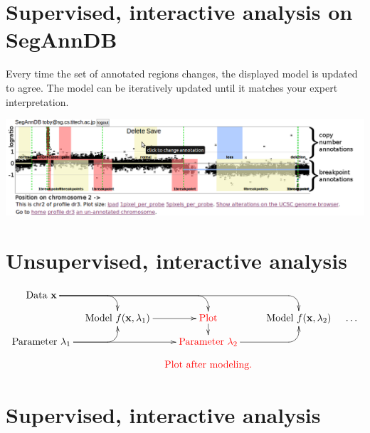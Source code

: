 \documentclass[a4paper,10pt]{article} %
\begin{document}
\section*{Supervised, interactive analysis on SegAnnDB
  \citep{HOCKING-SegAnnDB}}

Every time the set of annotated regions changes, the displayed model
is updated to agree. The model can be iteratively updated until it
matches your expert interpretation.

\includegraphics[width=\textwidth]{new-new-annotations}

\newpage

\section*{Unsupervised, interactive analysis}
\begin{displaymath}
  \xymatrix@=0.3cm{
    \text{Data $\mathbf x$}
    \ar `[r] [dr] 
    \ar `r[rr] [drr] 
    \ar `r[rrr] [drrr] 
    & \text{ }
    & \text{ }
    & \text{ }
    \\
    & 
    \text{Model $f(\mathbf x, \lambda_1)$} 
    \ar [r]
    & 
    \textcolor{red}{\text{Plot}}
    \ar[d]
    &
    \text{Model $f(\mathbf x, \lambda_2)$} & \dots
    \\
    \text{Parameter $\lambda_1$}
    \ar `r[ru] [ru]
    \ar [rr]
    & \text{ }
    & \textcolor{red}{\text{Parameter $\lambda_2$}}
    \ar `r[ru] [ru] \\
    & &   \textcolor{red}{\text{Plot after modeling.}}
  }
\end{displaymath}

\section*{Supervised, interactive analysis}
\end{document}
